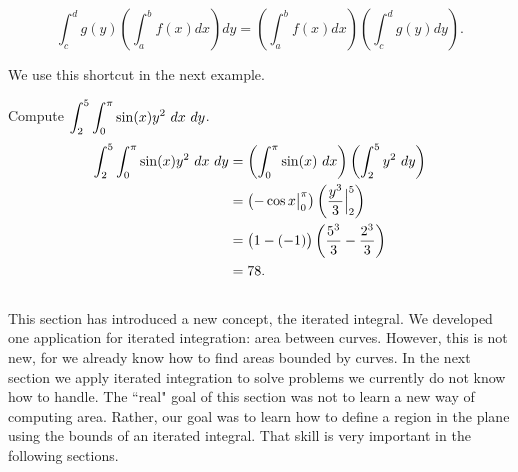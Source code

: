 $$\int_c^d g(y) \left( \int_a^b f(x) dx \right) dy = \left( \int_a^b f(x) dx \right) \left(\int_c^d g(y) dy\right).$$

We use this shortcut in the next example.

{Compute $\displaystyle \int_2^5 \int_0^{\pi} \sin(x)y^2\ dx\ dy$.
}
{\begin{align*}
\ds \int_2^5 \int_0^{\pi} \sin(x)y^2\ dx\ dy
&= \left(\int_0^{\pi} \sin(x)\ dx\right) \left(\int_2^5 y^2\ dy\right)\\
&=\left( -\cos x\big|_0^{\pi}\right) \left(\frac{y^3}{3}\Big|_2^5\right)\\
&=\big(1-(-1)\big) \left( \frac{5^3}{3} - \frac{2^3}{3} \right)\\
&=78.
\end{align*}
}\\

This section has introduced a new concept, the iterated integral. We developed one application for iterated integration: area between curves. However, this is not new, for we already know how to find areas bounded by curves.  In the next section we apply iterated integration to solve problems we currently do not know how to handle. The ``real" goal of this section was not to learn a new way of computing area. Rather, our goal was to learn how to define a region in the plane using the bounds of an iterated integral. That skill is very important in the following sections.

